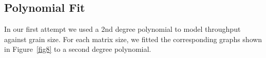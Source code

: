 \vspace{\baselineskip}	
\subsection{Polynomial Fit}
In our first attempt we used a 2nd degree polynomial to model throughput against grain size. For each matrix size, we fitted the corresponding graphs shown in Figure~\ref{fig8} to a second degree polynomial. 

\begin{figure}[H]
	\centering

\end{figure}
